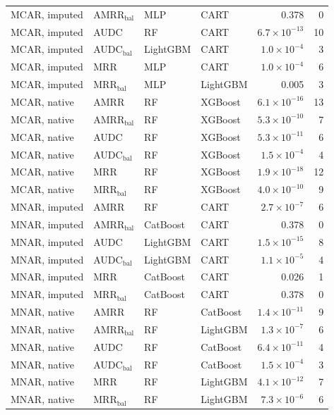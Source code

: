 \documentclass[pdflatex,sn-mathphys]{sn-jnl}
\theoremstyle{thmstyleone}
\begin{document}
\begin{table}[htbp]
\begin{tabular}{@{}llllrr@{}}
MCAR, imputed & AMRR$_{\mathrm{bal}}$ & MLP & CART & 0.378 & 0 \\
MCAR, imputed & AUDC & RF & CART & $6.7\times10^{-13}$ & 10 \\
MCAR, imputed & AUDC$_{\mathrm{bal}}$ & LightGBM & CART & $1.0\times10^{-4}$ & 3 \\
MCAR, imputed & MRR & MLP & CART & $1.0\times10^{-4}$ & 6 \\
MCAR, imputed & MRR$_{\mathrm{bal}}$ & MLP & LightGBM & 0.005 & 3 \\
MCAR, native & AMRR & RF & XGBoost & $6.1\times10^{-16}$ & 13 \\
MCAR, native & AMRR$_{\mathrm{bal}}$ & RF & XGBoost & $5.3\times10^{-10}$ & 7 \\
MCAR, native & AUDC & RF & XGBoost & $5.3\times10^{-11}$ & 6 \\
MCAR, native & AUDC$_{\mathrm{bal}}$ & RF & XGBoost & $1.5\times10^{-4}$ & 4 \\
MCAR, native & MRR & RF & XGBoost & $1.9\times10^{-18}$ & 12 \\
MCAR, native & MRR$_{\mathrm{bal}}$ & RF & XGBoost & $4.0\times10^{-10}$ & 9 \\
MNAR, imputed & AMRR & RF & CART & $2.7\times10^{-7}$ & 6 \\
MNAR, imputed & AMRR$_{\mathrm{bal}}$ & CatBoost & CART & 0.378 & 0 \\
MNAR, imputed & AUDC & LightGBM & CART & $1.5\times10^{-15}$ & 8 \\
MNAR, imputed & AUDC$_{\mathrm{bal}}$ & LightGBM & CART & $1.1\times10^{-5}$ & 4 \\
MNAR, imputed & MRR & CatBoost & CART & 0.026 & 1 \\
MNAR, imputed & MRR$_{\mathrm{bal}}$ & CatBoost & CART & 0.378 & 0 \\
MNAR, native & AMRR & RF & CatBoost & $1.4\times10^{-11}$ & 9 \\
MNAR, native & AMRR$_{\mathrm{bal}}$ & RF & LightGBM & $1.3\times10^{-7}$ & 6 \\
MNAR, native & AUDC & RF & CatBoost & $6.4\times10^{-11}$ & 4 \\
MNAR, native & AUDC$_{\mathrm{bal}}$ & RF & CatBoost & $1.5\times10^{-4}$ & 3 \\
MNAR, native & MRR & RF & LightGBM & $4.1\times10^{-12}$ & 7 \\
MNAR, native & MRR$_{\mathrm{bal}}$ & RF & LightGBM & $7.3\times10^{-6}$ & 6 \\
\bottomrule
\end{tabular}
\end{table}
\end{document}
